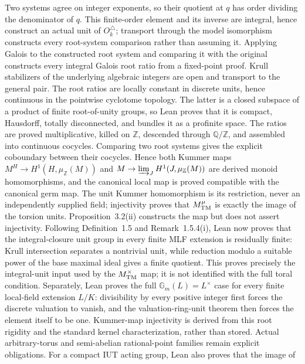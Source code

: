 \begin{definition}
  Two systems agree on integer exponents, so their quotient at \(q\) has order
  dividing the denominator of \(q\).  This finite-order element and its inverse
  are integral, hence construct an actual unit of
  \(O_{\overline{k}}^{\triangle}\); transport through the model isomorphism
  constructs every root-system comparison rather than assuming it.
  Applying Galois to the constructed root system and comparing it with the
  original constructs every integral Galois root ratio from a fixed-point
  proof.  Krull stabilizers of the underlying algebraic integers are open and
  transport to the general pair.  The root ratios are locally constant in
  discrete units, hence continuous in the pointwise cyclotome topology.  The
  latter is a closed subspace of a product of finite root-of-unity groups, so
  Lean proves that it is compact, Hausdorff, totally disconnected, and bundles
  it as a profinite space.  The ratios are proved multiplicative, killed
  on \(\mathbb Z\), descended through \(\mathbb Q/\mathbb Z\), and assembled
  into continuous cocycles.  Comparing two root systems gives the explicit
  coboundary between their cocycles.  Hence both Kummer maps
  \(M^H\to H^1(H,\mu_{\mathbb Z}(M))\) and
  \(M\to\varinjlim_JH^1(J,\mu_{\mathbb Z}(M))\) are derived monoid
  homomorphisms, and the canonical local map is proved compatible with the
  canonical germ map.
  The unit Kummer homomorphism is its restriction, never an independently
  supplied field; injectivity proves that \(M_{\rm TM}^{\mu}\) is exactly the
  image of the torsion units.  Proposition~3.2(ii) constructs the map but does
  not assert injectivity.  Following Definition~1.5 and Remark~1.5.4(i), Lean
  now proves that the integral-closure unit group in every finite MLF extension
  is residually finite: Krull intersection separates a nontrivial unit, while
  reduction modulo a suitable power of the base maximal ideal gives a finite
  quotient.  This proves precisely the integral-unit input used by the
  $M_{\rm TM}^{\times}$ map; it is not identified with the full toral
  condition.  Separately, Lean proves the full $\mathbb G_m(L)=L^\times$
  case for every finite local-field extension $L/K$: divisibility by every
  positive integer first forces the discrete valuation to vanish, and the
  valuation-ring-unit theorem then forces the element itself to be one.
  Kummer-map injectivity is derived from this root rigidity and the standard
  kernel characterization, rather than stored.  Actual arbitrary-torus and
  semi-abelian rational-point families remain explicit obligations.  For a
  compact IUT acting group, Lean also proves that the image of

\end{definition}
